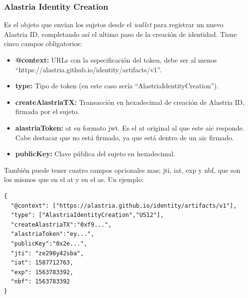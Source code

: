 \subsubsection*{Alastria Identity Creation}
Es el objeto que envían los sujetos desde el \textit{wallet} para registrar un nuevo Alastria ID, completando así el ultimo paso de la creación de identidad.
Tiene cinco campos obligatorios:
\begin{itemize}
    \item \textbf{@context:} URLs con la especificación del token, debe ser al menos\\ ``https://alastria.github.io/identity/artifacts/v1''.
    \item \textbf{type:} Tipo de token (en este caso sería ``AlastriaIdentityCreation'').
    \item \textbf{createAlastriaTX:} Transacción en hexadecimal de creación de Alastria ID, firmada por el sujeto.
    \item \textbf{alastriaToken:} \acrshort{at} en formato \acrshort{jwt}. Es el \acrshort{at} original al que este \acrshort{aic} responde. Cabe destacar que no está firmado, ya que está dentro de un \acrshort{aic} firmado.
    \item \textbf{publicKey:} Clave pública del sujeto en hexadecimal. 
\end{itemize}
También puede tener cuatro campos opcionales mas; jti, iat, exp y nbf, que son los mismos que en el \acrshort{at} y en el \acrshort{as}.
Un ejemplo:
\begin{verbatim}
{
  "@context": ["https://alastria.github.io/identity/artifacts/v1"],
  "type": ["AlastriaIdentityCreation","US12"],
  "createAlastriaTX":"0xf9...",
  "alastriaToken":"ey...",
  "publicKey":"0x2e...",
  "jti": "ze298y42sba",
  "iat": 1587712763,
  "exp": 1563783392,
  "nbf": 1563783392
}
\end{verbatim}
